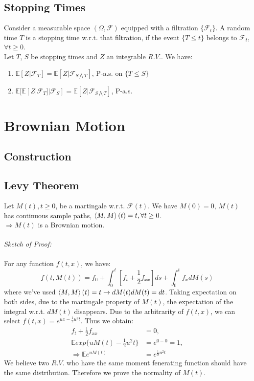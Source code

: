 \documentclass[a4paper, 11pt]{article}
\begin{document}
\subsection{Stopping Times}
Consider a measurable space $(\Omega, \mathcal{F})$ equipped with a filtration $\{ \mathcal{F}_t \}$. A random time $T$ is a stopping time w.r.t. that filtration, if the event $\{ T \leq t \}$ belongs to $\mathcal{F}_t$, $\forall t \geq 0$. \\
\indent Let $T$, $S$ be stopping times and $Z$ an integrable $R.V.$. We have:
\begin{enumerate}
	\item $\mathbb{E}[Z|{\mathcal{F}_T}] = \mathbb{E}[Z|{\mathcal{F}_{S \bigwedge T}}]$, P-a.s. on $\{ T \leq S \}$
	\item $\mathbb{E}[\mathbb{E}[Z|{\mathcal{F}_T}]|\mathcal{F}_S] = \mathbb{E}[Z|{\mathcal{F}_{S \bigwedge T}}]$, P-a.s.
\end{enumerate}
\section{Brownian Motion}

\subsection{Construction}

\subsection{Levy Theorem}
Let $M(t), t \geq 0$, be a martingale w.r.t. $\mathcal{F}(t)$. We have $M(0) = 0$, $M(t)$ has continuous sample paths, $\braket{M, M}(t) = t, \forall t \geq 0$.\\ 
$\Longrightarrow M(t)$ is a Brownian motion. \\
\\
\textit{Sketch of Proof:}\\
\\ For any function $f(t, x)$, we have:
\begin{equation}
f(t, M(t)) = f_0 + \int_0^t[f_{t} + \frac{1}{2}f_{xx}]ds + \int_0^t f_x dM(s)
\end{equation}
where we've used $\braket{M, M}(t) =t \rightarrow dM(t)dM(t) = dt$. Taking expectation on both sides, due to the martingale property of $M(t)$, the expectation of the integral w.r.t. $dM(t)$ disappears. Due to the arbitrarity of $f(t, x)$, we can select $f(t, x) = e^{ux - \frac{1}{2}u^2t}$. Thus we obtain:
\begin{subequations}
\begin{align}
f_t + \frac{1}{2}f_{xx} &= 0, \\
\mathbb{E}exp\{uM(t) - \frac{1}{2}u^2 t\} &= e^{0 - 0} = 1, \\
\Longrightarrow \mathbb{E}e^{uM(t)} &= e^{\frac{1}{2}u^2 t}
\end{align}
\end{subequations}
\indent We believe two $R.V.$ who have the same moment fenerating function should have the same distribution. Therefore we prove the normality of $M(t)$.
\end{document}
